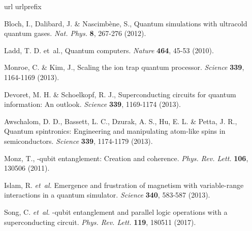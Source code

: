 \documentclass[prl,nobalancelastpage,twocolumn,superscriptaddress,nofootinbib]{revtex4}
\begin{document}
{
\renewcommand{\addcontentsline}[3]{}
\begin{thebibliography}{10}
\expandafter\ifx\csname url\endcsname\relax
  \def\url#1{\texttt{#1}}\fi
\expandafter\ifx\csname urlprefix\endcsname\relax\def\urlprefix{URL }\fi
\providecommand{\bibinfo}[2]{#2}
\providecommand{\eprint}[2][]{\url{#2}}

\bibinfo{author}{Bloch, I.,  Dalibard, J. \& Nascimb{\`e}ne, S.},
\newblock\bibinfo{title}{Quantum simulations with ultracold quantum gases}.
\emph{\bibinfo{journal}{Nat. Phys.}}
\textbf{\bibinfo{volume}{8}},
\bibinfo{pages}{267-276}
(\bibinfo{year}{2012}).


\bibinfo{author}{Ladd, T. D. et~al.},
\newblock\bibinfo{title}{Quantum computers}.
\emph{\bibinfo{journal}{Nature}}
\textbf{\bibinfo{volume}{464}},
\bibinfo{pages}{45-53}
(\bibinfo{year}{2010}).


\bibinfo{author}{Monroe, C. \& Kim, J.},
\newblock\bibinfo{title}{Scaling the ion trap quantum processor}.
\emph{\bibinfo{journal}{Science}}
\textbf{\bibinfo{volume}{339}},
\bibinfo{pages}{1164-1169}
(\bibinfo{year}{2013}).


\bibinfo{author}{Devoret, M. H. \& Schoelkopf, R. J.},
\newblock\bibinfo{title}{Superconducting circuits for quantum information: An outlook}.
\emph{\bibinfo{journal}{Science}}
\textbf{\bibinfo{volume}{339}},
\bibinfo{pages}{1169-1174}
(\bibinfo{year}{2013}).


\bibinfo{author}{Awschalom, D. D., Bassett, L. C., Dzurak, A. S., Hu, E. L. \& Petta, J. R.},
\newblock\bibinfo{title}{Quantum spintronics: Engineering and manipulating atom-like spins in semiconductors}.
\emph{\bibinfo{journal}{Science}}
\textbf{\bibinfo{volume}{339}},
\bibinfo{pages}{1174-1179}
(\bibinfo{year}{2013}).


\bibinfo{author}{Monz, T.},
\newblock\bibinfo{title}{14-qubit entanglement: Creation and coherence}.
\emph{\bibinfo{journal}{Phys. Rev. Lett.}}
\textbf{\bibinfo{volume}{106}},
\bibinfo{pages}{130506}
(\bibinfo{year}{2011}).

\bibinfo{author}{Islam, R.} \emph{et~al.}
\newblock\bibinfo{title}{Emergence and frustration of magnetism with variable-range interactions in a quantum simulator}.
\emph{\bibinfo{journal}{Science}}
\textbf{\bibinfo{volume}{340}},
\bibinfo{pages}{583-587}
(\bibinfo{year}{2013}).


\bibinfo{author}{Song, C.} \emph{et~al.}
\newblock\bibinfo{title}{10-qubit entanglement and parallel logic operations with a superconducting circuit}.
\emph{\bibinfo{journal}{Phys. Rev. Lett.}}
\textbf{\bibinfo{volume}{119}},
\bibinfo{pages}{180511}
(\bibinfo{year}{2017}).



\end{thebibliography}}
\end{document}
